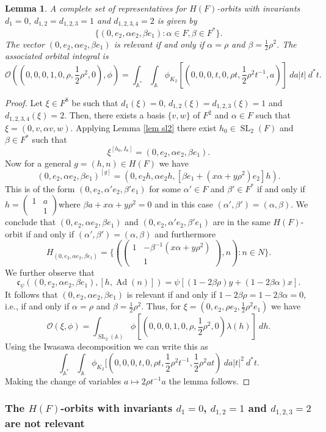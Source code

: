\documentclass[12pt]{amsart}
\newcommand{\abs}[1]{\left|{#1}\right|}
\newcommand{\SL}{\operatorname{SL}}
\newcommand{\Ad}{\operatorname{Ad}}
\newcommand{\A}{\mathbb{A}}
\renewcommand{\O}{\mathcal{O}}
\newcommand{\sm}[4]{\left(\begin{smallmatrix}{#1}&{#2}\\{#3}&{#4}\end{smallmatrix}\right)}
\renewcommand{\c}{\mathfrak{c}}
\newtheorem{lemma}[theorem]{Lemma}
\theoremstyle{remark}
\begin{document}
\begin{lemma}\label{relevant-2}
A complete set of representatives for $H(F)$-orbits with invariants $d_1=0$, $d_{1,2}=d_{1,2,3}=1$ and $d_{1,2,3,4}=2$ is given by 
\[
\{(0,e_2,\alpha e_2,\beta  e_1):\alpha\in F,\beta\in F^*\}.
\]
The vector $(0,e_2,\alpha e_2,\beta e_1)$ is relevant if and only if $\alpha=\rho$ and $\beta=\frac12\rho^2$. The associated orbital integral is
\[
\O((0,0,0,1,0,\rho,\frac12\rho^2,0),\phi)=\int_{\A^*}\int_{\A}\phi_{K_2}[(0,0,0,t,0,\rho t,\frac12\rho^2 t^{-1}, a)]\ da\abs{t}\ d^*t.
\]
\end{lemma}
\begin{proof}
Let $\xi\in F^8$ be such that $d_1(\xi)=0$, $d_{1,2}(\xi)=d_{1,2,3}(\xi)=1$ and $d_{1,2,3,4}(\xi)=2$. Then, there exists a basis $\{v,w\}$ of $F^2$ and $\alpha
\in F$ such that $\xi=(0,v,\alpha v,w)$. Applying Lemma \ref{lem sl2} there exist $h_0\in \SL_2(F)$ and $\beta\in F^*$ such that 
\[
\xi^{[h_0,I_8]}=(0,e_2,\alpha e_2,\beta e_1).
\]
 Now for a general $g=(h,n)\in H(F)$ we have
\[
(0,e_2,\alpha e_2,\beta e_1)^{[g]}=(0,e_2 h,\alpha e_2 h,[\beta e_1+(x\alpha+y\rho^2)e_2] h).
\]
This is of the form $(0,e_2,\alpha'e_2,\beta' e_1)$ for some $\alpha'\in F$ and $\beta'\in F^*$ if and only if $h=\sm{1}{a}{}{1}$where $\beta a+x\alpha+y\rho^2=0$ and in this case $(\alpha',\beta')=(\alpha,\beta)$. We conclude that $(0,e_2,\alpha e_2,\beta e_1)$ and $(0,e_2,\alpha'e_2,\beta' e_1)$ are in the same $H(F)$-orbit if and only if $(\alpha',\beta')=(\alpha,\beta)$ and furthermore 
\[
H_{(0,e_2,\alpha e_2,\beta e_1)}=\{(\begin{pmatrix} 1 & -\beta^{-1}(x\alpha+y\rho^2) \\  & 1 \end{pmatrix}, n): n\in N \}.
\] 
We further observe that 
\[
\c_{\psi}((0,e_2,\alpha e_2,\beta  e_1),[h,\Ad(n)])=\psi[(1-2\beta \rho)y+(1-2\beta\alpha)x].
\]
It follows that $(0,e_2, \alpha e_2,\beta  e_1)$ is relevant if and only if $1-2\beta\rho=1-2\beta\alpha=0$, i.e.,  if and only if $\alpha=\rho$ and $\beta=\frac12\rho^2$.
Thus, for $\xi=(0,e_2,\rho e_2,\frac12\rho^2 e_1)$ we have
\[
\O(\xi,\phi)= \int_{\SL_2(\A)} \phi[(0,0,0,1,0,\rho,\frac12\rho^2,0)\lambda(h)]\ dh.
\]
Using the Iwasawa decomposition we can write this as
\[
\int_{\A^*}\int_{\A}\phi_{K_2}[(0,0,0,t,0,\rho t,\frac12\rho^2 t^{-1},\frac12\rho^2 a t)\ da\abs{t}^2\ d^*t.
\]
Making the change of variables $a\mapsto 2\rho t^{-1} a$ the lemma follows. 

\end{proof}
\subsubsection{The $H(F)$-orbits with invariants $d_1=0$, $d_{1,2}=1$ and $d_{1,2,3}=2$ are not relevant}
\end{document}
